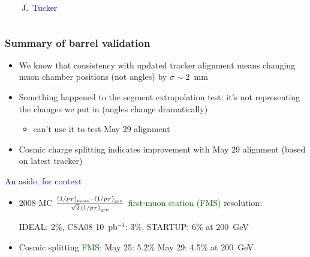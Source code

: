 \documentclass[compress]{beamer}
\begin{document}
\begin{frame}
\begin{columns}
\mbox{ }

\vspace{4 cm}
\textcolor{darkblue}{\scriptsize J.~Tucker}
\end{columns}
\end{frame}

\begin{frame}
\frametitle{Summary of barrel validation}
\begin{itemize}\setlength{\itemsep}{0.25 cm}
\item We know that consistency with updated tracker alignment means
  changing muon chamber positions (not angles) by $\sigma \sim 2$~mm
\item Something happened to the segment extrapolation test: it's not
  representing the changes we put in (angles change dramatically)
\begin{itemize}
\item can't use it to test May 29 alignment
\end{itemize}
\item Cosmic charge splitting indicates improvement with May 29
  alignment (based on latest tracker)
\end{itemize}

\vfill
\hspace{-0.83 cm} \textcolor{darkblue}{\Large An aside, for context}
\begin{itemize}\setlength{\itemsep}{0.35 cm}
\item 2008 MC $\frac{\left(1/p_T\right)_{\mbox{\tiny meas}} - \left(1/p_T\right)_{\mbox{\tiny gen}}}{\sqrt{2} \, \left(1/p_T\right)_{\mbox{\tiny gen}}}$ \textcolor{darkgreen}{first-muon station (FMS)} resolution:

\vspace{0.1 cm}
IDEAL: 2\%, CSA08 10~pb$^{-1}$: 3\%, STARTUP: 6\% at 200~GeV
\item Cosmic splitting \textcolor{darkgreen}{FMS}: May 25: 5.2\% May 29: 4.5\% at 200~GeV
\end{itemize}
\end{frame}
\end{document}
